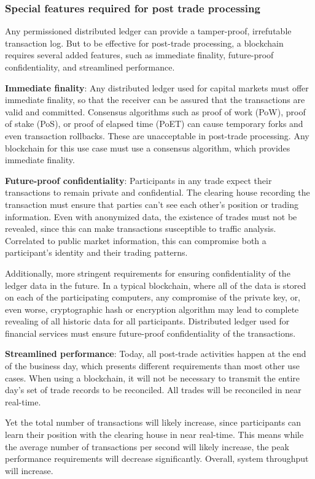 \subsubsection{Special features required for post trade processing}

Any permissioned distributed ledger can provide a tamper-proof, irrefutable transaction log. But to be effective for post-trade processing, a blockchain requires several added features, such as immediate finality, future-proof confidentiality, and streamlined performance. 

\textbf{Immediate finality}:  Any distributed ledger used for capital markets must offer immediate finality, so that the receiver can be assured that the transactions are valid and committed. Consensus algorithms such as proof of work (PoW), proof of stake (PoS), or proof of elapsed time (PoET) can cause temporary forks and even transaction rollbacks. These are unacceptable in post-trade processing. Any blockchain for this use case must use a consensus algorithm, which provides immediate finality.

\textbf{Future-proof confidentiality}: Participants in any trade expect their transactions to remain private and confidential. The clearing house recording the transaction must ensure that parties can't see each other's position or trading information. Even with anonymized data, the existence of trades must not be revealed, since this can make transactions susceptible to traffic analysis. Correlated to public market information, this can compromise both a participant's identity and their trading patterns.

Additionally, more stringent requirements for ensuring confidentiality of the ledger data in the future. In a typical blockchain, where all of the data is stored on each of the participating computers, any compromise of the private key, or, even worse, cryptographic hash or encryption algorithm may lead to complete revealing of all historic data for all participants. Distributed ledger used for financial services must ensure future-proof confidentiality of the transactions.

\textbf{Streamlined performance}: Today, all post-trade activities happen at the end of the business day, which presents different  requirements than most other use cases. When using a blockchain, it will not be necessary to transmit the entire day's set of trade records to be reconciled. All trades will be reconciled in near real-time.

Yet the total number of transactions will likely increase, since participants can learn their position with the clearing house in near real-time. This means while the average number of transactions per second will likely increase, the peak performance requirements will decrease significantly. Overall, system throughput will increase.

